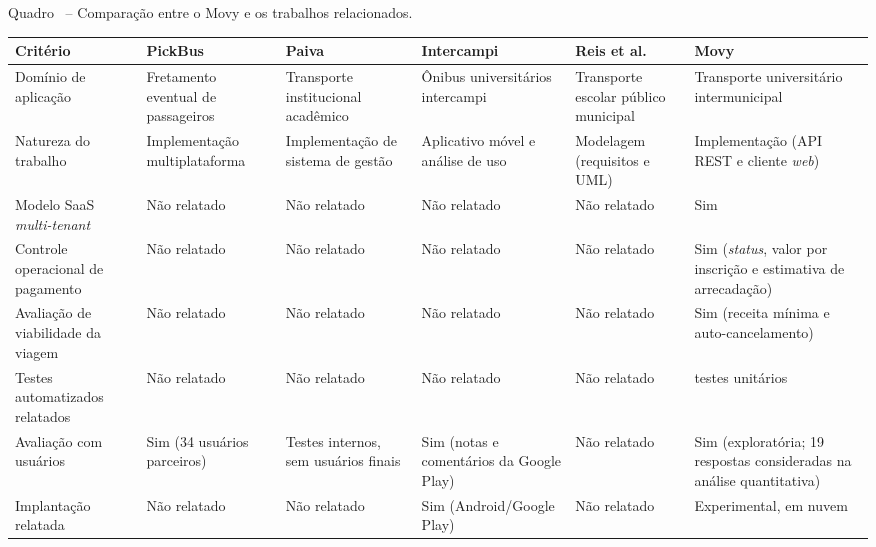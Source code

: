 \documentclass[a4paper,12pt]{article}
\renewenvironment{quadroCustom}[3][!htbp]{%
  \refstepcounter{quadro}
  \label{#3}%
  \begin{table}[#1]
    \centering
    {Quadro \thequadro~-- #2\par}%
    \medskip
}{%
  \end{table}
  \FloatBarrier
}
\begin{document}
\begin{quadroCustom}{Comparação entre o Movy e os trabalhos relacionados.}{qua:trabalhos_relacionados}
{\scriptsize
\renewcommand{\arraystretch}{1.08}
\begin{tabularx}{\textwidth}{|>{\raggedright\arraybackslash}p{2.65cm}|>{\raggedright\arraybackslash}X|>{\raggedright\arraybackslash}X|>{\raggedright\arraybackslash}X|>{\raggedright\arraybackslash}X|>{\raggedright\arraybackslash}X|}
\hline
\textbf{Critério} & \textbf{PickBus} \cite{pickbus2021} & \textbf{Paiva} \cite{paiva2023} & \textbf{Intercampi} \cite{bizerril2024intercampi} & \textbf{Reis et al.} \cite{reis2021transporte} & \textbf{Movy} \\ \hline
Domínio de aplicação & Fretamento eventual de passageiros & Transporte institucional acadêmico & Ônibus universitários intercampi & Transporte escolar público municipal & Transporte universitário intermunicipal \\ \hline
Natureza do trabalho & Implementação multiplataforma & Implementação de sistema de gestão & Aplicativo móvel e análise de uso & Modelagem (requisitos e UML) & Implementação (API REST e cliente \textit{web}) \\ \hline
Modelo SaaS \textit{multi-tenant} & Não relatado & Não relatado & Não relatado & Não relatado & Sim \\ \hline
Controle operacional de pagamento & Não relatado & Não relatado & Não relatado & Não relatado & Sim (\textit{status}, valor por inscrição e estimativa de arrecadação) \\ \hline
Avaliação de viabilidade da viagem & Não relatado & Não relatado & Não relatado & Não relatado & Sim (receita mínima e auto-cancelamento) \\ \hline
Testes automatizados relatados & Não relatado & Não relatado & Não relatado & Não relatado & 458 testes unitários \\ \hline
Avaliação com usuários & Sim (34 usuários parceiros) & Testes internos, sem usuários finais & Sim (notas e comentários da Google Play) & Não relatado & Sim (exploratória; 19 respostas consideradas na análise quantitativa) \\ \hline
Implantação relatada & Não relatado & Não relatado & Sim (Android/Google Play) & Não relatado & Experimental, em nuvem \\ \hline
\end{tabularx}
}
\end{quadroCustom}
\end{document}
